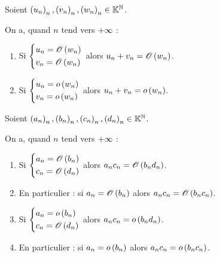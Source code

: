 \begin{prop}[Sommes]
Soient \(\left(u_n\right)_n,\left(v_n\right)_n,\left(w_n\right)_n\in\mathbb{K}^{\mathbb{N}}\).

On a, quand \(n\) tend vers \(+\infty\) :

\begin{enumerate}
    \item Si \(\begin{dcases}
        u_n=\mathscr{O}\left(w_n\right) \\
        v_n=\mathscr{O}\left(w_n\right)
    \end{dcases}\) alors \(u_n+v_n=\mathscr{O}\left(w_n\right)\). \\
    \item Si \(\begin{dcases}
        u_n=o\left(w_n\right) \\
        v_n=o\left(w_n\right)
    \end{dcases}\) alors \(u_n+v_n=o\left(w_n\right)\).
\end{enumerate}
\end{prop}

\begin{prop}[Produits]
Soient \(\left(a_n\right)_n,\left(b_n\right)_n,\left(c_n\right)_n,\left(d_n\right)_n\in\mathbb{K}^{\mathbb{N}}\).

On a, quand \(n\) tend vers \(+\infty\) :

\begin{enumerate}
    \item Si \(\begin{dcases}
        a_n=\mathscr{O}\left(b_n\right) \\
        c_n=\mathscr{O}\left(d_n\right)
    \end{dcases}\) alors \(a_nc_n=\mathscr{O}\left(b_nd_n\right)\). \\
    \item En particulier : si \(a_n=\mathscr{O}\left(b_n\right)\) alors \(a_nc_n=\mathscr{O}\left(b_nc_n\right)\). \\
    \item Si \(\begin{dcases}
        a_n=o\left(b_n\right) \\
        c_n=\mathscr{O}\left(d_n\right)
    \end{dcases}\) alors \(a_nc_n=o\left(b_nd_n\right)\). \\
    \item En particulier : si \(a_n=o\left(b_n\right)\) alors \(a_nc_n=o\left(b_nc_n\right)\).
\end{enumerate}
\end{prop}

